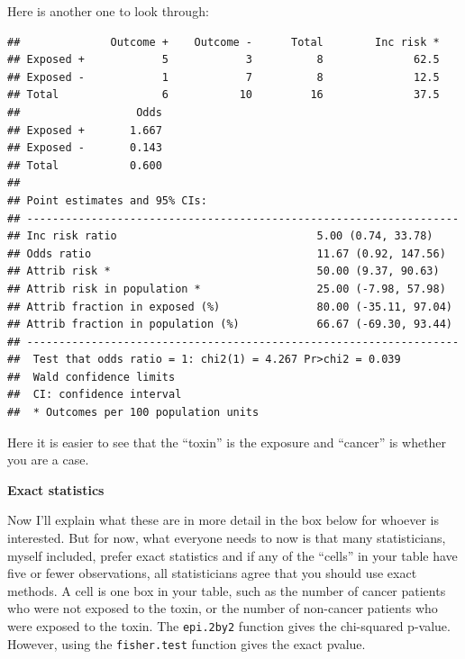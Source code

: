 \documentclass[]{book}
\newenvironment{Shaded}{\begin{snugshade}}{\end{snugshade}}
\newcommand{\DataTypeTok}[1]{\textcolor[rgb]{0.13,0.29,0.53}{#1}}
\newcommand{\DecValTok}[1]{\textcolor[rgb]{0.00,0.00,0.81}{#1}}
\newcommand{\KeywordTok}[1]{\textcolor[rgb]{0.13,0.29,0.53}{\textbf{#1}}}
\newcommand{\NormalTok}[1]{#1}
\newcommand{\OperatorTok}[1]{\textcolor[rgb]{0.81,0.36,0.00}{\textbf{#1}}}
\begin{document}
Here is another one to look through:

\begin{Shaded}
\end{Shaded}

\begin{verbatim}
##              Outcome +    Outcome -      Total        Inc risk *
## Exposed +            5            3          8              62.5
## Exposed -            1            7          8              12.5
## Total                6           10         16              37.5
##                  Odds
## Exposed +       1.667
## Exposed -       0.143
## Total           0.600
## 
## Point estimates and 95% CIs:
## -------------------------------------------------------------------
## Inc risk ratio                               5.00 (0.74, 33.78)
## Odds ratio                                   11.67 (0.92, 147.56)
## Attrib risk *                                50.00 (9.37, 90.63)
## Attrib risk in population *                  25.00 (-7.98, 57.98)
## Attrib fraction in exposed (%)               80.00 (-35.11, 97.04)
## Attrib fraction in population (%)            66.67 (-69.30, 93.44)
## -------------------------------------------------------------------
##  Test that odds ratio = 1: chi2(1) = 4.267 Pr>chi2 = 0.039
##  Wald confidence limits
##  CI: confidence interval
##  * Outcomes per 100 population units
\end{verbatim}

Here it is easier to see that the ``toxin'' is the exposure and
``cancer'' is whether you are a case.

\textbf{Exact statistics}

Now I'll explain what these are in more detail in the box below for
whoever is interested. But for now, what everyone needs to now is that
many statisticians, myself included, prefer exact statistics and if any
of the ``cells'' in your table have five or fewer observations, all
statisticians agree that you should use exact methods. A cell is one box
in your table, such as the number of cancer patients who were not
exposed to the toxin, or the number of non-cancer patients who were
exposed to the toxin. The \texttt{epi.2by2} function gives the
chi-squared p-value. However, using the \texttt{fisher.test} function
gives the exact pvalue.
\end{document}
